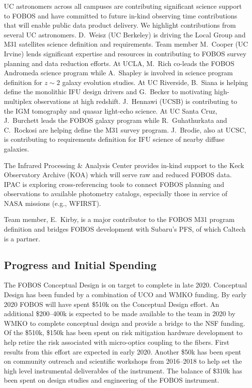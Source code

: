 \documentclass[oneside,11pt]{amsart}
\begin{document}
 UC astronomers across all campuses are contributing significant science support to FOBOS and have committed to future in-kind observing time contributions that will enable public data product delivery.  We highlight contributions from several UC astronomers.  D.~Weisz (UC Berkeley) is driving the Local Group and M31 satellites science definition and requirements.  Team member M.~Cooper (UC Irvine) lends significant expertise and resources in contributing to FOBOS survey planning and data reduction efforts.  At UCLA, M.~Rich co-leads the FOBOS Andromeda science program while A.~Shapley is involved in science program definition for $z \sim 2$ galaxy evolution studies.  At UC Riverside, B.~Siana is helping define the monolithic IFU design drivers and G.~Becker to motivating high-multiplex observations at high redshift.  J.~Hennawi (UCSB) is contributing to the IGM tomography and quasar light-echo science.  At UC Santa Cruz, J.~Burchett leads the FOBOS galaxy program while R.~Guhathurkata and C.~Rockosi are helping define the M31 survey program.  J.~Brodie, also at UCSC, is contributing to requirements definition for IFU science of nearby diffuse galaxies.

 The Infrared Processing \& Analysis Center provides in-kind support to the Keck Observatory Archive (KOA) which will serve raw and reduced FOBOS data.  IPAC is exploring cross-referencing tools to connect FOBOS planning and observations to available photometry catalogs, especially those in service of NASA missions (e.g., WFIRST).

 Team member, E.~Kirby, is a major contributor to the FOBOS M31 program definition and bridges FOBOS development with Subaru's PFS, of which Caltech is a partner.


\subsection{Progress and Initial Spending}


The FOBOS Conceptual Design is on target to complete in late 2020.  Conceptual Design has been funded by a combination
of UCO and WMKO funding.  By early 2020 FOBOS will have spent \$510k on the Conceptual Design effort. An additional
\$200--400k is expected to be made available to the team in 2020 by WMKO to complete conceptual design and provide a
bridge to the NSF funding.  Of the \$510k, \$150k has been spent on risk mitigation hardware development to help retire
the risk associated with micro-optics coupling to the fibers.  First results from this effort are expected in early
2020.  Another \$50k has been spent on community outreach and scientific workshops from 2016--2018 to help set the high
level instrumental deliverables of the instrument.  The balance of \$310k has been spent on design studies and
engineering of the FOBOS instrument.
\end{document}
